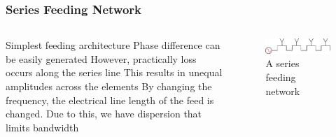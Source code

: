 \documentclass[10pt]{beamer}
\begin{document}
\begin{frame}
    \frametitle{Series Feeding Network}
    \begin{columns}[] %
        \begin{column}{.6\textwidth}
            \begin{outline}
                \1 Simplest feeding architecture
                \2 Phase difference can be easily generated
                \1 However, practically loss occurs along the series line
                \2 This results in unequal amplitudes across the elements
                \1 By changing the frequency, the electrical line length of the feed is changed.
                \2 Due to this, we have dispersion that limits bandwidth
            \end{outline}   
        \end{column}
        \begin{column}{.4\textwidth}
            \begin{figure}[h!]
                \centering
                \includegraphics[width=.8\textwidth]{series.pdf}
                \caption{A series feeding network}
            \end{figure}
        \end{column}%
    \end{columns}
\end{frame}
\end{document}
